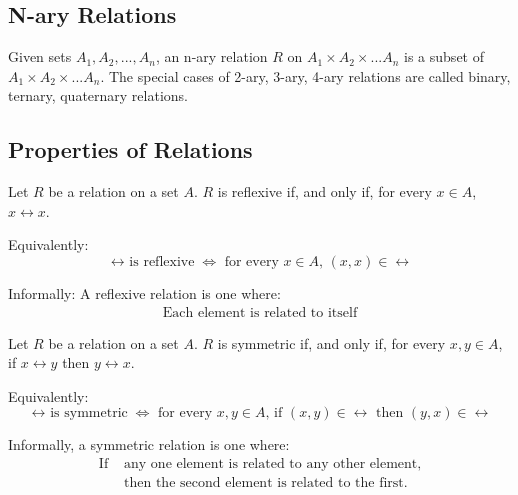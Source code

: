 \documentclass[11pt]{article}
\begin{document}
\subsection{N-ary Relations}
\begin{definition}\label{def:n-ary-relations}
    Given sets $A_1, A_2, ..., A_n$, an n-ary relation $R$ on $A_1 \times A_2 \times ... A_n$
    is a subset of $A_1 \times A_2 \times ... A_n$. The special cases of 2-ary, 3-ary, 4-ary
    relations are called binary, ternary, quaternary relations.
\end{definition}

\subsection{Properties of Relations}

\begin{definition}[Reflexivity]\label{def:reflexivity}
    Let $R$ be a relation on a set $A$.
    \bl
    $R$ is reflexive if, and only if, for every $x \in A$, $x \rel x$.

    Equivalently:
    \begin{equation*}
        \text{$\rel$ is reflexive} \iff \text{ for every $x \in A$, $(x,x) \in \rel$}
    \end{equation*}

    Informally: A reflexive relation is one where:
    \begin{align*}
        \text{Each element is related to itself}
    \end{align*}
 \end{definition}

\begin{definition}[Symmetry]\label{def:symmetry}
    Let $R$ be a relation on a set $A$.
    \bl 
    $R$ is symmetric if, and only if, for every $x,y \in A$, if $x \rel y$ then $y \rel x$.

    Equivalently:
    \begin{equation*}
        \text{$\rel$ is symmetric} \iff \text{ for every $x,y \in A$, if $(x,y) \in \rel$ then $(y,x) \in \rel$}
    \end{equation*}

    Informally, a symmetric relation is one where:
    \begin{align*}
        \text{If } &\text{any one element is related to any other element,} \\
                   &\text{then the second element is related to the first.} \\
    \end{align*}
\end{definition}
\end{document}
